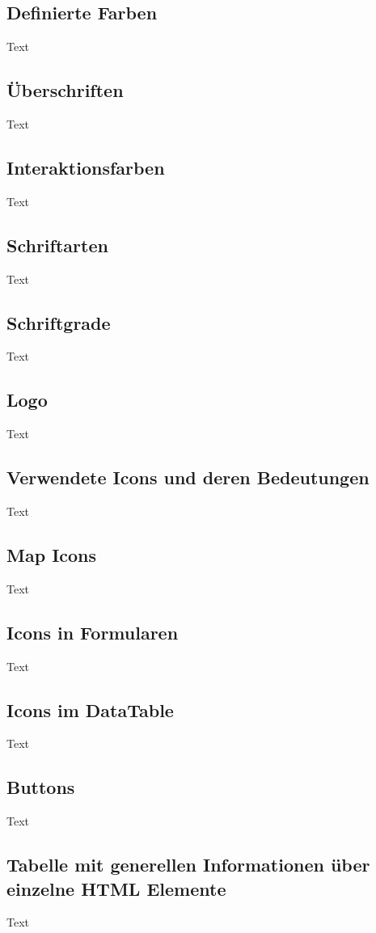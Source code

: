 \subsection{Definierte Farben}
Text

\subsection{Überschriften}
Text

\subsection{Interaktionsfarben}
Text

\subsection{Schriftarten}
Text

\subsection{Schriftgrade}
Text

\subsection{Logo}
Text

\subsection{Verwendete Icons und deren Bedeutungen}
Text

\subsection{Map Icons}
Text

\subsection{Icons in Formularen}
Text

\subsection{Icons im DataTable}
Text

\subsection{Buttons}
Text

\subsection{Tabelle mit generellen Informationen über einzelne HTML Elemente}
Text

